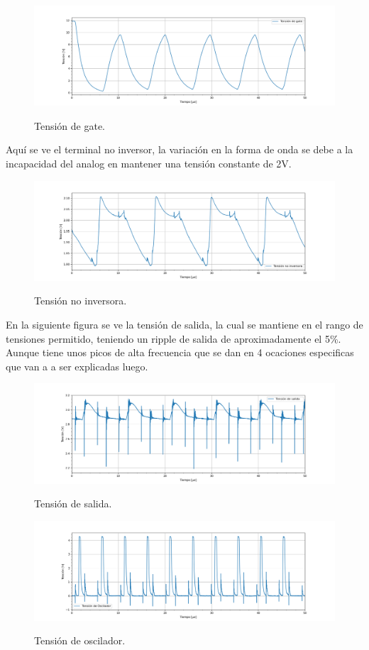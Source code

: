 \begin{figure}[H]
	\centering
	\includegraphics[width=0.9\linewidth]{ImagenesParteIV/Vgs.png}
	\label{fig:vgs_4}
	\caption{Tensión de gate.}
\end{figure}
Aquí se ve el terminal no inversor, la variación en la forma de onda se debe a la incapacidad del analog en mantener una tensión constante de 2V.
\begin{figure}[H]
	\centering	\includegraphics[width=0.9\linewidth]{ImagenesParteIV/Vni.png}
	\label{fig:vni_4}
	\caption{Tensión no inversora.}
\end{figure}

En la siguiente figura se ve  la tensión de salida, la cual se mantiene en el rango de tensiones permitido, teniendo un ripple de salida de aproximadamente el 5\%.  Aunque tiene unos picos de alta frecuencia que se dan en 4 ocaciones especificas que van a a ser explicadas luego.

\begin{figure}[H]
	\centering	\includegraphics[width=0.9\linewidth]{ImagenesParteIV/Vout.png}
	\label{fig:vout_4}
	\caption{Tensión de salida.}
\end{figure}
\begin{figure}[H]
	\centering
	\includegraphics[width=0.9\linewidth]{ImagenesParteIV/Vosc.png}
	\label{fig:vosc4}
	\caption{Tensión de oscilador.}
\end{figure}


